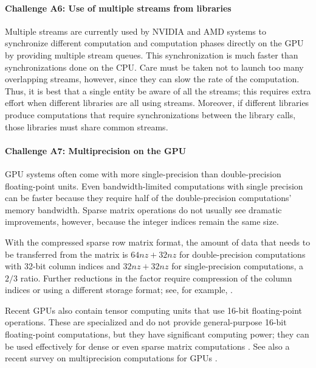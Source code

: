 \documentclass[5p,times]{elsarticle}
\begin{document}
\paragraph{Challenge A6: Use of multiple streams from libraries}
Multiple streams are currently used by NVIDIA and AMD systems to synchronize different computation and computation phases directly on the GPU by providing multiple stream queues.
This synchronization
is much faster than synchronizations done on the CPU.
Care must be taken not to launch too many overlapping streams, however, since  they can slow the rate of the
computation. Thus,  it is best that a single entity be aware of all the streams; this requires extra effort when different libraries are all using streams.
Moreover, if different libraries produce computations that require synchronizations between the library calls, those libraries must share common streams.




\paragraph{Challenge A7: Multiprecision on the GPU}
GPU systems often come with more single-precision than
double-precision floating-point units. Even bandwidth-limited computations with single precision can be faster because they
require half of the double-precision computations' memory bandwidth. 
Sparse matrix operations do not usually see dramatic improvements, however, because the
integer indices remain the same size.

With the compressed sparse row matrix format, the amount of data that needs to be
transferred from the matrix is $ 64 nz + 32 nz$ for double-precision
computations with 32-bit column indices and $ 32 nz + 32 nz$ for single-precision computations, a $ 2/3 $ ratio. Further reductions in the factor
require compression of the column indices or 
using a different storage format; see, for example, \cite{filippone2017GPGPUSpMV}.

Recent GPUs also contain tensor computing units that use 16-bit floating-point operations. These are specialized and do not provide general-purpose 16-bit
floating-point computations, but they have significant computing power; they can be used effectively for dense \cite{haidar2018harnessing} or even sparse matrix computations \cite{zachariadis2020accelerating}. See
also a recent survey on multiprecision computations for GPUs \cite{blanchard2020mixed}. 
\end{document}
